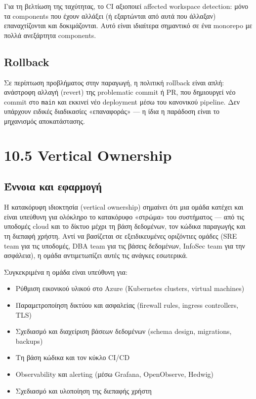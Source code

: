 Για τη βελτίωση της ταχύτητας, το CI αξιοποιεί affected workspace
detection: μόνο τα components που έχουν αλλάξει (ή εξαρτώνται από αυτά
που άλλαξαν) επαναχτίζονται και δοκιμάζονται. Αυτό είναι ιδιαίτερα
σημαντικό σε ένα monorepo με πολλά ανεξάρτητα components.

\subsection{Rollback}\label{rollback}

Σε περίπτωση προβλήματος στην παραγωγή, η πολιτική rollback είναι απλή:
ανάστροφη αλλαγή (revert) της problematic commit ή PR, που δημιουργεί
νέο commit στο \texttt{main} και εκκινεί νέο deployment μέσω του
κανονικού pipeline. Δεν υπάρχουν ειδικές διαδικασίες «επαναφοράς» --- η
ίδια η παράδοση είναι το μηχανισμός αποκατάστασης.

\section{10.5 Vertical Ownership}\label{vertical-ownership}

\subsection{Έννοια και
εφαρμογή}\label{ux3adux3bdux3bdux3bfux3b9ux3b1-ux3baux3b1ux3b9-ux3b5ux3c6ux3b1ux3c1ux3bcux3bfux3b3ux3ae}

Η κατακόρυφη ιδιοκτησία (vertical ownership) σημαίνει ότι μια ομάδα
κατέχει και είναι υπεύθυνη για ολόκληρο το κατακόρυφο «στρώμα» του
συστήματος --- από τις υποδομές cloud και το δίκτυο μέχρι τη βάση
δεδομένων, τον κώδικα παραγωγής και τη διεπαφή χρήστη. Αντί να βασίζεται
σε εξειδικευμένες οριζόντιες ομάδες (SRE team για τις υποδομές, DBA team
για τις βάσεις δεδομένων, InfoSec team για την ασφάλεια), η ομάδα
αντιμετωπίζει αυτές τις ανάγκες εσωτερικά.

Συγκεκριμένα η ομάδα είναι υπεύθυνη για:

\begin{itemize}
\tightlist
\item
  Ρύθμιση εικονικού υλικού στο Azure (Kubernetes clusters, virtual
  machines)
\item
  Παραμετροποίηση δικτύου και ασφαλείας (firewall rules, ingress
  controllers, TLS)
\item
  Σχεδιασμό και διαχείριση βάσεων δεδομένων (schema design, migrations,
  backups)
\item
  Τη βάση κώδικα και τον κύκλο CI/CD
\item
  Observability και alerting (μέσω Grafana, OpenObserve, Hedwig)
\item
  Σχεδιασμό και υλοποίηση της διεπαφής χρήστη
\end{itemize}

